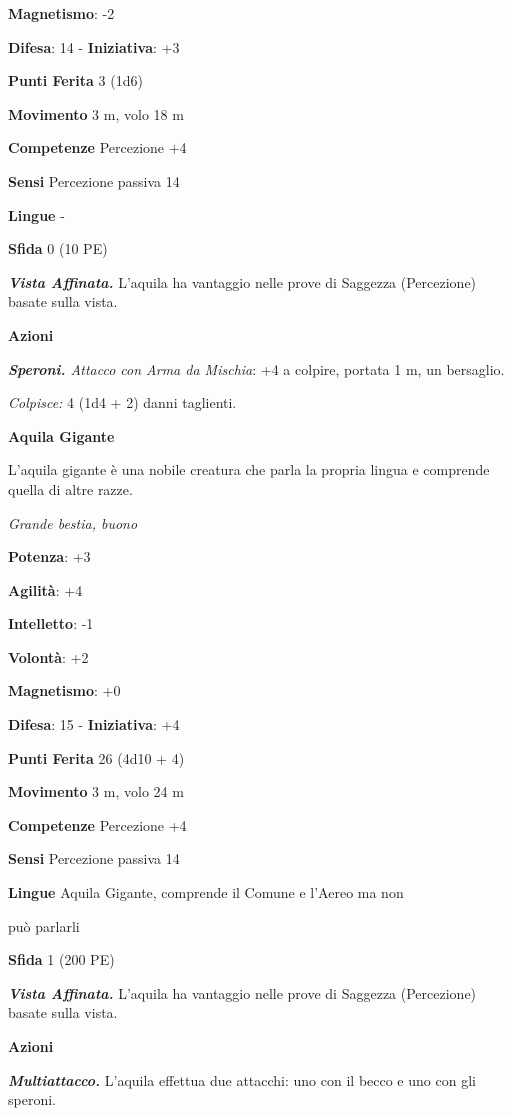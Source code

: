 \begin{multicols}{2}
\textbf{Magnetismo}: -2

\textbf{Difesa}: 14 - \textbf{Iniziativa}: +3

\textbf{Punti Ferita} 3 (1d6)

\textbf{Movimento} 3 m, volo 18 m

\textbf{Competenze} Percezione +4

\textbf{Sensi} Percezione passiva 14

\textbf{Lingue} -

\textbf{Sfida} 0 (10 PE)\smallskip

\emph{\textbf{Vista Affinata.}} L'aquila ha vantaggio nelle prove di
Saggezza (Percezione) basate sulla vista.

\smallskip\textbf{Azioni}

\emph{\textbf{Speroni.} Attacco con Arma da Mischia}: +4 a colpire,
portata 1 m, un bersaglio.

\emph{Colpisce:} 4 (1d4 + 2) danni taglienti.

\textbf{Aquila Gigante}

L'aquila gigante è una nobile creatura che parla la propria lingua e
comprende quella di altre razze.

\emph{Grande bestia, buono}

\textbf{Potenza}: +3

\textbf{Agilità}: +4

\textbf{Intelletto}: -1

\textbf{Volontà}: +2

\textbf{Magnetismo}: +0

\textbf{Difesa}: 15 - \textbf{Iniziativa}: +4

\textbf{Punti Ferita} 26 (4d10 + 4)

\textbf{Movimento} 3 m, volo 24 m

\textbf{Competenze} Percezione +4

\textbf{Sensi} Percezione passiva 14

\textbf{Lingue} Aquila Gigante, comprende il Comune e l'Aereo ma non

può parlarli

\textbf{Sfida} 1 (200 PE)\smallskip

\emph{\textbf{Vista Affinata.}} L'aquila ha vantaggio nelle prove di
Saggezza (Percezione) basate sulla vista.

\smallskip\textbf{Azioni}

\emph{\textbf{Multiattacco.}} L'aquila effettua due attacchi: uno con il
becco e uno con gli speroni.


\end{multicols}
